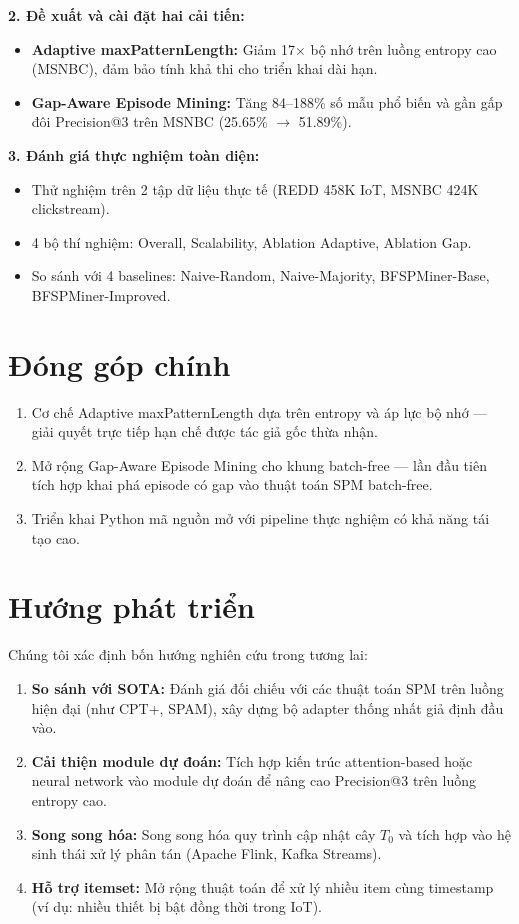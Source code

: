 \documentclass[a4paper,12pt]{report}
\begin{document}
\textbf{2. Đề xuất và cài đặt hai cải tiến:}
\begin{itemize}
    \item \textbf{Adaptive maxPatternLength:} Giảm 17$\times$ bộ nhớ trên luồng entropy cao (MSNBC), đảm bảo tính khả thi cho triển khai dài hạn.
    \item \textbf{Gap-Aware Episode Mining:} Tăng 84--188\% số mẫu phổ biến và gần gấp đôi Precision@3 trên MSNBC (25.65\% $\rightarrow$ 51.89\%).
\end{itemize}

\textbf{3. Đánh giá thực nghiệm toàn diện:}
\begin{itemize}
    \item Thử nghiệm trên 2 tập dữ liệu thực tế (REDD 458K IoT, MSNBC 424K clickstream).
    \item 4 bộ thí nghiệm: Overall, Scalability, Ablation Adaptive, Ablation Gap.
    \item So sánh với 4 baselines: Naive-Random, Naive-Majority, BFSPMiner-Base, BFSPMiner-Improved.
\end{itemize}

\section{Đóng góp chính}
\begin{enumerate}
    \item Cơ chế Adaptive maxPatternLength dựa trên entropy và áp lực bộ nhớ --- giải quyết trực tiếp hạn chế được tác giả gốc thừa nhận.
    \item Mở rộng Gap-Aware Episode Mining cho khung batch-free --- lần đầu tiên tích hợp khai phá episode có gap vào thuật toán SPM batch-free.
    \item Triển khai Python mã nguồn mở với pipeline thực nghiệm có khả năng tái tạo cao.
\end{enumerate}

\section{Hướng phát triển}
Chúng tôi xác định bốn hướng nghiên cứu trong tương lai:

\begin{enumerate}
    \item \textbf{So sánh với SOTA:} Đánh giá đối chiếu với các thuật toán SPM trên luồng hiện đại (như CPT+, SPAM), xây dựng bộ adapter thống nhất giả định đầu vào.
    \item \textbf{Cải thiện module dự đoán:} Tích hợp kiến trúc attention-based hoặc neural network vào module dự đoán để nâng cao Precision@3 trên luồng entropy cao.
    \item \textbf{Song song hóa:} Song song hóa quy trình cập nhật cây $T_0$ và tích hợp vào hệ sinh thái xử lý phân tán (Apache Flink, Kafka Streams).
    \item \textbf{Hỗ trợ itemset:} Mở rộng thuật toán để xử lý nhiều item cùng timestamp (ví dụ: nhiều thiết bị bật đồng thời trong IoT).
\end{enumerate}
\end{document}
